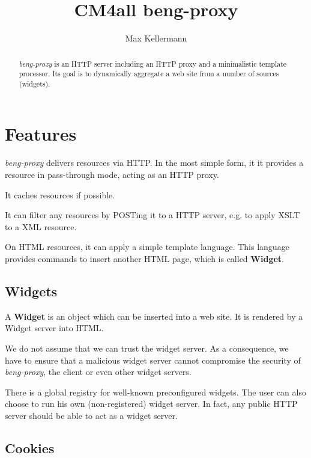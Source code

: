 \documentclass[a4paper,12pt]{article}
\begin{document}
\title{CM4all beng-proxy}
\author{Max Kellermann}

\maketitle

\begin{abstract}
\emph{beng-proxy} is an HTTP server including an HTTP proxy and a
minimalistic template processor.  Its goal is to dynamically aggregate
a web site from a number of sources (widgets).
\end{abstract}

\setcounter{tocdepth}{2}
\tableofcontents
\newpage

\section{Features}

\emph{beng-proxy} delivers resources via HTTP.  In the most simple form, it
it provides a resource in pass-through mode, acting as an HTTP proxy.

It caches resources if possible.

It can filter any resources by POSTing it to a HTTP server,
e.g. to apply XSLT to a XML resource.

On HTML resources, it can apply a simple template language.  This
language provides commands to insert another HTML page, which is
called \textbf{Widget}.

\subsection{Widgets}

A \textbf{Widget} is an object which can be inserted into a web site.
It is rendered by a Widget server into HTML.

We do not assume that we can trust the widget server.  As a
consequence, we have to ensure that a malicious widget server cannot
compromise the security of \emph{beng-proxy}, the client or even other
widget servers.

There is a global registry for well-known preconfigured widgets.  The
user can also choose to run his own (non-registered) widget server.
In fact, any public HTTP server should be able to act as a widget
server.


\subsection{Cookies}
\end{document}
